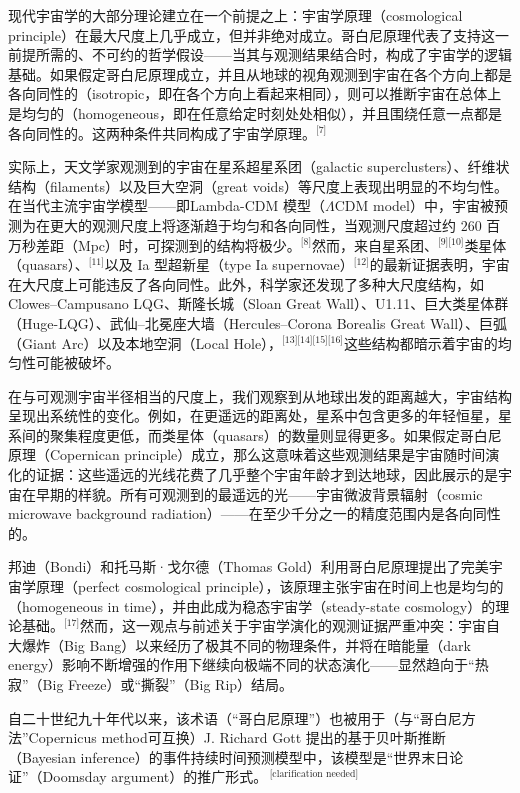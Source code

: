 现代宇宙学的大部分理论建立在一个前提之上：宇宙学原理（cosmological principle）在最大尺度上几乎成立，但并非绝对成立。哥白尼原理代表了支持这一前提所需的、不可约的哲学假设——当其与观测结果结合时，构成了宇宙学的逻辑基础。如果假定哥白尼原理成立，并且从地球的视角观测到宇宙在各个方向上都是各向同性的（isotropic，即在各个方向上看起来相同），则可以推断宇宙在总体上是均匀的（homogeneous，即在任意给定时刻处处相似），并且围绕任意一点都是各向同性的。这两种条件共同构成了宇宙学原理。\(^\text{[7]}\)

实际上，天文学家观测到的宇宙在星系超星系团（galactic superclusters）、纤维状结构（filaments）以及巨大空洞（great voids）等尺度上表现出明显的不均匀性。在当代主流宇宙学模型——即Lambda-CDM 模型（$\Lambda$CDM model）中，宇宙被预测为在更大的观测尺度上将逐渐趋于均匀和各向同性，当观测尺度超过约 $260$ 百万秒差距（$\mathrm{Mpc}$）时，可探测到的结构将极少。\(^\text{[8]}\)然而，来自星系团、\(^\text{[9][10]}\)类星体（quasars）、\(^\text{[11]}\)以及 Ia 型超新星（type Ia supernovae）\(^\text{[12]}\)的最新证据表明，宇宙在大尺度上可能违反了各向同性。此外，科学家还发现了多种大尺度结构，如 Clowes–Campusano LQG、斯隆长城（Sloan Great Wall）、U1.11、巨大类星体群（Huge-LQG）、武仙–北冕座大墙（Hercules–Corona Borealis Great Wall）、巨弧（Giant Arc）以及本地空洞（Local Hole），\(^\text{[13][14][15][16]}\)这些结构都暗示着宇宙的均匀性可能被破坏。

在与可观测宇宙半径相当的尺度上，我们观察到从地球出发的距离越大，宇宙结构呈现出系统性的变化。例如，在更遥远的距离处，星系中包含更多的年轻恒星，星系间的聚集程度更低，而类星体（quasars）的数量则显得更多。如果假定哥白尼原理（Copernican principle）成立，那么这意味着这些观测结果是宇宙随时间演化的证据：这些遥远的光线花费了几乎整个宇宙年龄才到达地球，因此展示的是宇宙在早期的样貌。所有可观测到的最遥远的光——宇宙微波背景辐射（cosmic microwave background radiation）——在至少千分之一的精度范围内是各向同性的。

邦迪（Bondi）和托马斯·戈尔德（Thomas Gold）利用哥白尼原理提出了完美宇宙学原理（perfect cosmological principle），该原理主张宇宙在时间上也是均匀的（homogeneous in time），并由此成为稳态宇宙学（steady-state cosmology）的理论基础。\(^\text{[17]}\)然而，这一观点与前述关于宇宙学演化的观测证据严重冲突：宇宙自大爆炸（Big Bang）以来经历了极其不同的物理条件，并将在暗能量（dark energy）影响不断增强的作用下继续向极端不同的状态演化——显然趋向于“热寂”（Big Freeze）或“撕裂”（Big Rip）结局。

自二十世纪九十年代以来，该术语（“哥白尼原理”）也被用于（与“哥白尼方法”Copernicus method可互换）J. Richard Gott 提出的基于贝叶斯推断（Bayesian inference）的事件持续时间预测模型中，该模型是“世界末日论证”（Doomsday argument）的推广形式。\,\(^\text{[clarification needed]}\)
